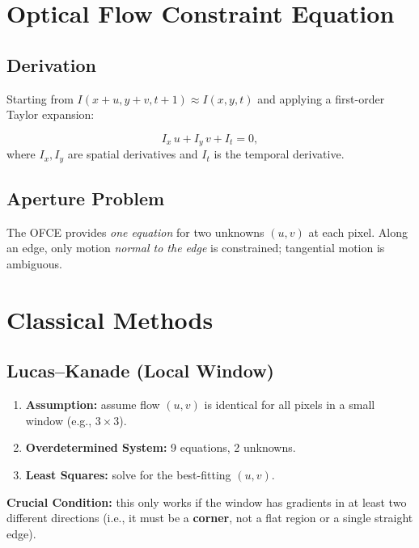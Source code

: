 \documentclass[11pt, oneside]{book}
\begin{document}
\begin{thmbox}[title={Reprojection Error Minimization}]
\begin{defbox}[title={Correlation and Convolution}]
\begin{defbox}[title={ReLU and Pooling}]
\begin{defbox}[title={Segmentation}]
\begin{defbox}[title={Graph-Based Segmentation}]
\begin{defbox}[title={U-Net}]
\section{Optical Flow Constraint Equation}

\subsection{Derivation}

Starting from $I(x+u,y+v,t+1)\approx I(x,y,t)$ and applying a first-order Taylor expansion:

\begin{thmbox}[title={Optical Flow Constraint Equation (OFCE)}]
\[
I_x\,u + I_y\,v + I_t = 0,
\]
where $I_x,I_y$ are spatial derivatives and $I_t$ is the temporal derivative.
\end{thmbox}

\subsection{Aperture Problem}

\begin{defbox}[title={Aperture Problem}]
The OFCE provides \emph{one equation} for two unknowns $(u,v)$ at each pixel.
Along an edge, only motion \emph{normal to the edge} is constrained; tangential motion is ambiguous.
\end{defbox}

\section{Classical Methods}

\subsection{Lucas--Kanade (Local Window)}

\begin{thmbox}[title={Lucas-Kanade Solution}]
\begin{enumerate}
  \item \textbf{Assumption:} assume flow $(u,v)$ is identical for all pixels in a small window (e.g., $3 \times 3$).
  \item \textbf{Overdetermined System:} 9 equations, 2 unknowns.
  \item \textbf{Least Squares:} solve for the best-fitting $(u,v)$.
\end{enumerate}
\textbf{Crucial Condition:} this only works if the window has gradients in at least two different directions
(i.e., it must be a \textbf{corner}, not a flat region or a single straight edge).
\end{thmbox}


\end{defbox}
\end{defbox}
\end{defbox}
\end{defbox}
\end{defbox}
\end{thmbox}
\end{document}
